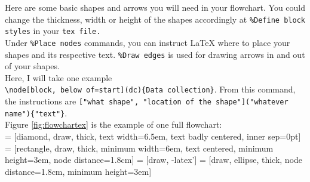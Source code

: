 Here are some basic shapes and arrows you will need in your flowchart. You could change the thickness, width or height of the shapes accordingly at \verb+%Define block styles+ in your \verb+tex file.+\\

Under \verb+%Place nodes+ commands, you can instruct {\LaTeX} where to place your shapes and its respective text. \verb+%Draw edges+ is used for drawing arrows in and out of your shapes.\\

Here, I will take one example\\

\verb+\node[block, below of=start](dc){Data collection}+. From this command, the instructions are \verb+["what shape", "location of the shape"]("whatever name"){"text"}+.\\

Figure \ref{fig:flowchartex} is the example of one full flowchart:\\

 = [diamond, draw, thick, 
    text width=6.5em, text badly centered, inner sep=0pt]
 = [rectangle, draw, thick, minimum width=6em, text centered, minimum height=3em, node distance=1.8cm]
 = [draw, -latex']
 = [draw, ellipse, thick, node distance=1.8cm,
    minimum height=3em]

